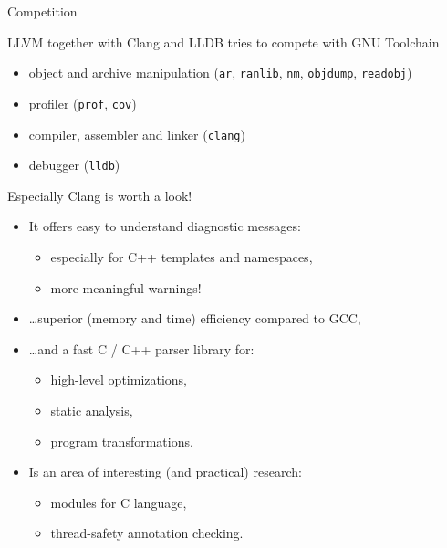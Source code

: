 \documentclass[8pt]{beamer}
\begin{document}
\begin{frame}[fragile]{Competition}
  \begin{block}{LLVM together with Clang and LLDB tries to compete with GNU Toolchain}
    \begin{itemize}
      \item object and archive manipulation (\verb+ar+, \verb+ranlib+,
        \verb+nm+, \verb+objdump+, \verb+readobj+)
      \item profiler (\verb+prof+, \verb+cov+)
      \item compiler, assembler and linker (\verb+clang+)
      \item debugger (\verb+lldb+)
    \end{itemize}
  \end{block}

  \begin{alertblock}{Especially Clang is worth a look!}
    \begin{itemize}
      \item It offers easy to understand diagnostic messages:
        \begin{itemize}
          \item especially for C++ templates and namespaces,
          \item more meaningful warnings!
        \end{itemize}
      \item \ldots superior (memory and time) efficiency compared to GCC,
      \item \ldots and a fast C / C++ parser library for:
        \begin{itemize}
          \item high-level optimizations,
          \item static analysis,
          \item program transformations.
        \end{itemize}
      \item Is an area of interesting (and practical) research:
        \begin{itemize}
          \item modules for C language,
          \item thread-safety annotation checking.
        \end{itemize}
    \end{itemize}
  \end{alertblock}
\end{frame}
\end{document}
